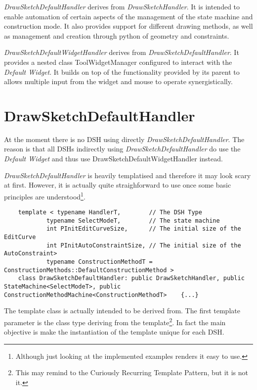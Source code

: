 \documentclass[12pt,twoside,a4paper]{book}
\newcommand{\DrawSketchHandler}{\emph{DrawSketchHandler}}
\newcommand{\DefaultWidget}{\emph{Default Widget}}
\newcommand{\DrawSketchDefaultHandler}{\emph{DrawSketchDefaultHandler}}
\newcommand{\DrawSketchDefaultWidgetHandler}{\emph{DrawSketchDefaultWidgetHandler}}
\begin{document}
    \DrawSketchDefaultHandler{} derives from \DrawSketchHandler{}. It is intended to enable automation of certain aspects of the management of the state machine and construction mode. It also provides support for different drawing methods, as well as management and creation through python of geometry and constraints.

    \DrawSketchDefaultWidgetHandler{} derives from \DrawSketchDefaultHandler{}. It provides a nested class ToolWidgetManager configured to interact with the \DefaultWidget. It builds on top of the functionality provided by its parent to allows multiple input from the widget and mouse to operate synergistically.

    \section{DrawSketchDefaultHandler}

    At the moment there is no DSH using directly \DrawSketchDefaultHandler{}. The reason is that all DSHs indirectly using \DrawSketchDefaultHandler{} do use the \DefaultWidget{} and thus use DrawSketchDefaultWidgetHandler instead.

    \DrawSketchDefaultHandler{} is heavily templatised and therefore it may look scary at first. However, it is actually quite straighforward to use once some basic principles are understood\footnote{Although just looking at the implemented examples renders it easy to use.}.

    \begin{lstlisting}
    template < typename HandlerT,        // The DSH Type
            typename SelectModeT,        // The state machine
            int PInitEditCurveSize,      // The initial size of the EditCurve
            int PInitAutoConstraintSize, // The initial size of the AutoConstraint>
            typename ConstructionMethodT = ConstructionMethods::DefaultConstructionMethod >
    class DrawSketchDefaultHandler: public DrawSketchHandler, public StateMachine<SelectModeT>, public ConstructionMethodMachine<ConstructionMethodT>    {...}
    \end{lstlisting}

    The template class is actually intended to be derived from. The first template parameter is the class type deriving from the template\footnote{This may remind to the Curiously Recurring Template Pattern, but it is not it.}. In fact the main objective is make the instantiation of the template unique for each DSH.
\end{document}

